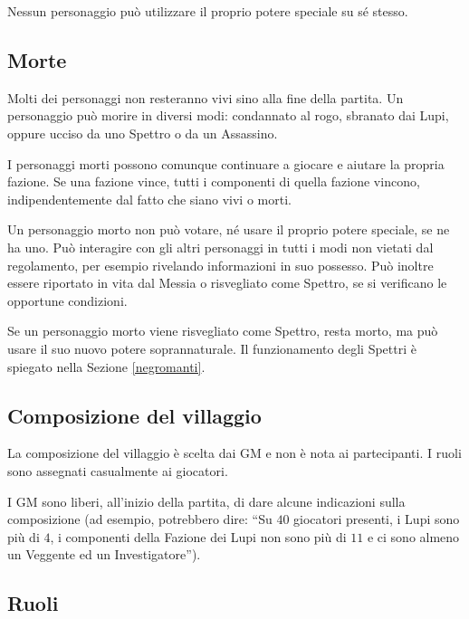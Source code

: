 \documentclass[a4paper,10pt]{article}
\begin{document}
Nessun personaggio può utilizzare il proprio potere speciale su sé stesso.


\subsection{Morte}

Molti dei personaggi non resteranno vivi sino alla fine della partita. Un personaggio può morire in diversi modi: condannato al rogo, sbranato dai Lupi, oppure ucciso da uno Spettro o da un Assassino.

I personaggi morti possono comunque continuare a giocare e aiutare la propria fazione. Se una fazione vince, tutti i componenti di quella fazione vincono, indipendentemente dal fatto che siano vivi o morti.

Un personaggio morto non può votare, né usare il proprio potere speciale, se ne ha uno. Può interagire con gli altri personaggi in tutti i modi non vietati dal regolamento, per esempio rivelando informazioni in suo possesso. Può inoltre essere riportato in vita dal Messia o risvegliato come Spettro, se si verificano le opportune condizioni.

Se un personaggio morto viene risvegliato come Spettro, resta morto, ma può usare il suo nuovo potere soprannaturale. Il funzionamento degli Spettri è spiegato nella Sezione \ref{negromanti}.


\subsection{Composizione del villaggio}
 
La composizione del villaggio è scelta dai GM e non è nota ai partecipanti. I ruoli sono assegnati casualmente ai giocatori.

I GM sono liberi, all'inizio della partita, di dare alcune indicazioni sulla composizione (ad esempio, potrebbero dire: ``Su $40$ giocatori presenti, i Lupi sono più di $4$, i componenti della Fazione dei Lupi non sono più di $11$ e ci sono almeno un Veggente ed un Investigatore'').


\subsection{Ruoli}
\label{ruoli}

\end{document}
